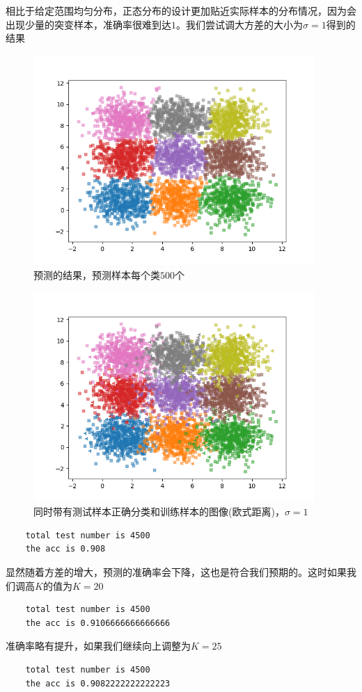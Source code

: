 \documentclass{article}
\begin{document}
相比于给定范围均匀分布，正态分布的设计更加贴近实际样本的分布情况，因为会出现少量的突变样本，准确率很难到达$1$。我们尝试调大方差的大小为$\sigma=1$得到的结果
\begin{figure}[H]
    \centering
    \begin{minipage}[t]{1.0\linewidth}
        \centering
        \includegraphics[height=8cm]{sigma1.png}
        \caption{预测的结果，预测样本每个类$500$个}
    \end{minipage}
 \end{figure}
 \begin{figure}[H]
    \centering
    \begin{minipage}[t]{1.0\linewidth}
        \centering
        \includegraphics[height=8cm]{sigma1withtest.png}
        \caption{同时带有测试样本正确分类和训练样本的图像(欧式距离)，$\sigma=1$}
    \end{minipage}
 \end{figure}
 \begin{verbatim}
    total test number is 4500
    the acc is 0.908
    \end{verbatim}
显然随着方差的增大，预测的准确率会下降，这也是符合我们预期的。这时如果我们调高$K$的值为$K=20$
\begin{verbatim}
    total test number is 4500
    the acc is 0.9106666666666666
    \end{verbatim}
准确率略有提升，如果我们继续向上调整为$K=25$
\begin{verbatim}
    total test number is 4500
    the acc is 0.9082222222222223
    \end{verbatim}
\end{document}
